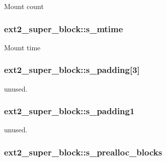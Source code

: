 Mount count \hypertarget{structext2__super__block_a3966a51d4e26f1b0280798db227b9720}{
\subsubsection[{s\+\_\+mtime}]{ ext2\+\_\+super\+\_\+block\+::s\+\_\+mtime}}\label{structext2__super__block_a3966a51d4e26f1b0280798db227b9720}
Mount time \hypertarget{structext2__super__block_a81b4e1959f344b5b7445044806d27807}{
\subsubsection[{s\+\_\+padding}]{ ext2\+\_\+super\+\_\+block\+::s\+\_\+padding\mbox{[}3\mbox{]}}}\label{structext2__super__block_a81b4e1959f344b5b7445044806d27807}
unused. \hypertarget{structext2__super__block_a1b0760049d39f6cfb1b26af0a01f64d2}{
\subsubsection[{s\+\_\+padding1}]{ ext2\+\_\+super\+\_\+block\+::s\+\_\+padding1}}\label{structext2__super__block_a1b0760049d39f6cfb1b26af0a01f64d2}
unused. \hypertarget{structext2__super__block_a352689df3b3cb2a357bde6645e3c7f29}{
\subsubsection[{s\+\_\+prealloc\+\_\+blocks}]{ ext2\+\_\+super\+\_\+block\+::s\+\_\+prealloc\+\_\+blocks}}\label{structext2__super__block_a352689df3b3cb2a357bde6645e3c7f29}
